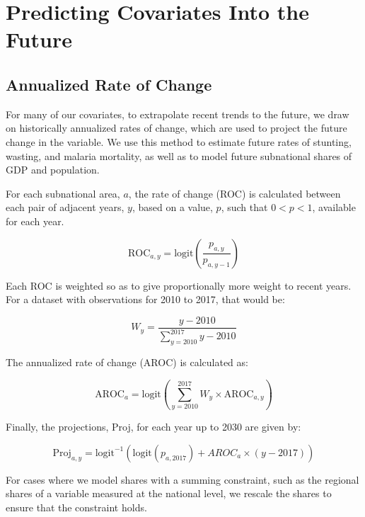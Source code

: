 \documentclass{article}
\begin{document}
\section{Predicting Covariates Into the Future}
\subsection{Annualized Rate of Change}
For many of our covariates, to extrapolate recent trends to the future, we draw on historically annualized rates of change, which are used to project the future change in the variable. We use this method to estimate future rates of stunting, wasting, and malaria mortality, as well as to model future subnational shares of GDP and population.

For each subnational area, $a$, the rate of change (ROC) is calculated between each pair of adjacent years, $y$, based on a value, $p$, such that $0 < p < 1$, available for each year.

\begin{equation}
  \text{ROC}_{a,y} = \text{logit} \left( \frac{p_{a,y}}{p_{a,y-1}} \right)
  \label{eqn:a}
\end{equation}

Each ROC is weighted so as to give proportionally more weight to recent years.  For a dataset with observations for 2010 to 2017, that would be:

\begin{equation}
  W_y = \frac{y - 2010}{\sum_{y=2010}^{2017} y - 2010}
  \label{eqn:b}
\end{equation}

The annualized rate of change (AROC) is calculated as:

\begin{equation}
  \text{AROC}_{a} = \text{logit} \left( \sum_{y=2010}^{2017} W_y \times \text{AROC}_{a, y} \right)
  \label{eqn:c}
\end{equation}

Finally, the projections, Proj, for each year up to 2030 are given by:

\begin{equation}
  \text{Proj}_{a,y} = \text{logit}^{-1} ( \text{logit} ( p_{a,2017} ) + AROC_{a} \times ( y - 2017 ) )
  \label{eqn:d}
\end{equation}

For cases where we model shares with a summing constraint, such as the regional shares of a variable measured at the national level, we rescale the shares to ensure that the constraint holds.
\end{document}
